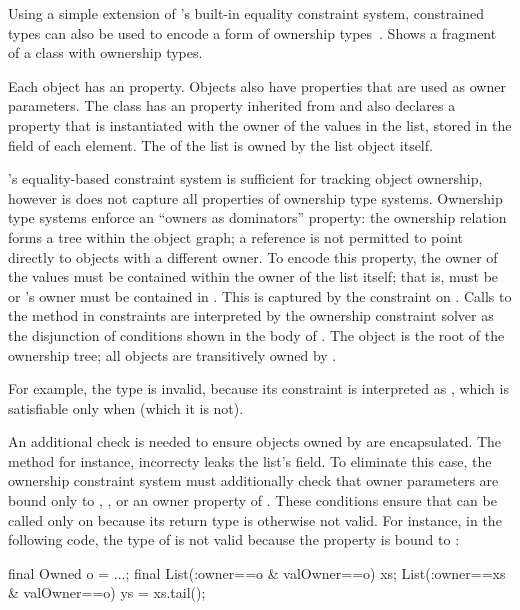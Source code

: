 Using a simple extension of \Xten{}'s built-in equality
constraint system,
constrained types can also be used to encode a form of ownership
types~\cite{ownership-types,liskov-popl2003}.
Shows a fragment of a  class with ownership types.

Each  object has an  property.  Objects
also have properties that are used as owner parameters.
%
The  class has an  property inherited from
 and also declares a  property that is
instantiated with the owner of the values in the list, stored in
the  field of each element.  The  of the
list is owned by the list object itself.

\Xten{}'s equality-based constraint system is sufficient for
tracking object ownership, however is does not capture all
properties of ownership type systems.
Ownership type systems enforce an ``owners as dominators''
property: the ownership relation forms a tree within the object
graph; a reference is not permitted to point directly to objects
with a different owner.
%
To encode this property, the owner of
the values  must be contained within the owner
of the list itself; that is,  must be 
or 's owner must be contained in .
This is captured by the constraint  on
.  Calls to the  method in constraints
are interpreted by the ownership constraint solver as the
disjunction of conditions shown in the body of .
The object  is the root of the ownership tree; 
all objects are transitively owned by .

For example, the type 
is invalid, because
its constraint is interpreted as
,
which is satisfiable only when  (which it is not).

An additional check is needed to ensure objects owned by
 are encapsulated.
The  method for instance, incorrecty leaks the
list's  field.  To eliminate this case, the ownership
constraint system must additionally check that owner parameters
are bound only to 
, , or an owner property of .
These conditions ensure that  can be called only on
 because its return type is otherwise not valid.
For instance, in the following code, the type of  is
not valid because the  property is bound to :
\begin{displayxten}
    final Owned o = ...;
    final List(:owner==o & valOwner==o) xs;
    List(:owner==xs & valOwner==o) ys = xs.tail();
\end{displayxten}

